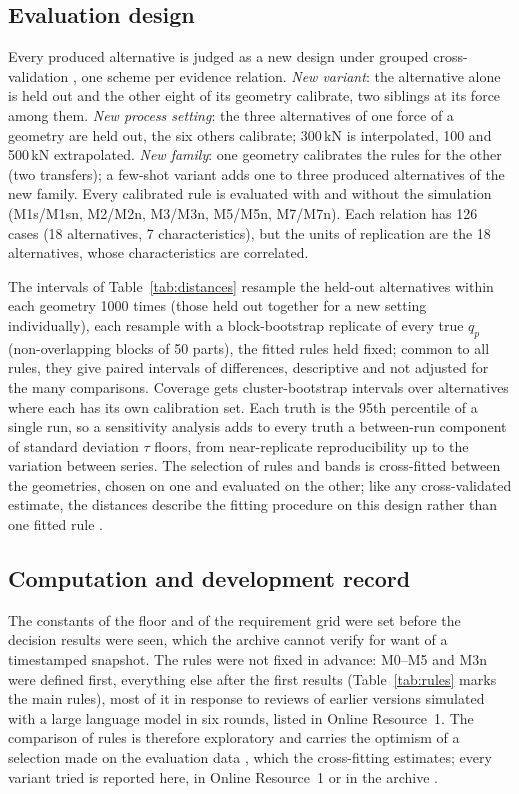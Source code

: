\documentclass[pdflatex,sn-basic,lineno]{sn-jnl}
\begin{document}
\subsection{Evaluation design}\label{sec:evaldesign}

Every produced alternative is judged as a new design under grouped cross-validation \citep{roberts2017cross}, one scheme per evidence relation. \emph{New variant}: the alternative alone is held out and the other eight of its geometry calibrate, two siblings at its force among them. \emph{New process setting}: the three alternatives of one force of a geometry are held out, the six others calibrate; 300\,kN is interpolated, 100 and 500\,kN extrapolated. \emph{New family}: one geometry calibrates the rules for the other (two transfers); a few-shot variant adds one to three produced alternatives of the new family. Every calibrated rule is evaluated with and without the simulation (M1s/M1sn, M2/M2n, M3/M3n, M5/M5n, M7/M7n). Each relation has 126 cases (18 alternatives, 7 characteristics), but the units of replication are the 18 alternatives, whose characteristics are correlated.

The intervals of Table~\ref{tab:distances} resample the held-out alternatives within each geometry 1000 times (those held out together for a new setting individually), each resample with a block-bootstrap replicate of every true $q_p$ (non-overlapping blocks of 50 parts), the fitted rules held fixed; common to all rules, they give paired intervals of differences, descriptive and not adjusted for the many comparisons. Coverage gets cluster-bootstrap intervals over alternatives where each has its own calibration set. Each truth is the 95th percentile of a single run, so a sensitivity analysis adds to every truth a between-run component of standard deviation $\tau$ floors, from near-replicate reproducibility up to the variation between series. The selection of rules and bands is cross-fitted between the geometries, chosen on one and evaluated on the other; like any cross-validated estimate, the distances describe the fitting procedure on this design rather than one fitted rule \citep{bates2024cross}.

\subsection{Computation and development record}\label{sec:computation}

The constants of the floor and of the requirement grid were set before the decision results were seen, which the archive cannot verify for want of a timestamped snapshot. The rules were not fixed in advance: M0--M5 and M3n were defined first, everything else after the first results (Table~\ref{tab:rules} marks the main rules), most of it in response to reviews of earlier versions simulated with a large language model in six rounds, listed in Online Resource~1. The comparison of rules is therefore exploratory and carries the optimism of a selection made on the evaluation data \citep{cawley2010over, varma2006bias}, which the cross-fitting estimates; every variant tried is reported here, in Online Resource~1 or in the archive \citep{canseven2026archive}.
\end{document}
